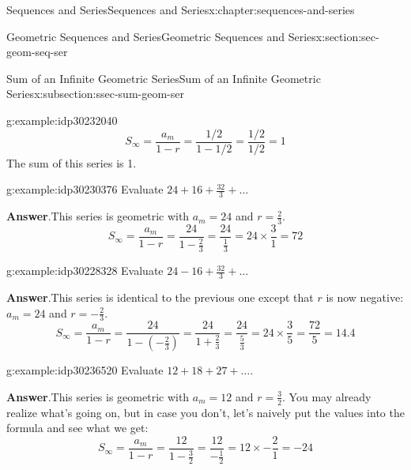 \documentclass[twoside,10pt,]{book}
\newcommand{\blocktitlefont}{\relax}
\numberwithin{equation}{section}
\begin{document}
\begin{chapterptx}{Sequences and Series}{}{Sequences and Series}{}{}{x:chapter:sequences-and-series}
\begin{sectionptx}{Geometric Sequences and Series}{}{Geometric Sequences and Series}{}{}{x:section:sec-geom-seq-ser}
\begin{subsectionptx}{Sum of an Infinite Geometric Series}{}{Sum of an Infinite Geometric Series}{}{}{x:subsection:ssec-sum-geom-ser}
\begin{example}{}{g:example:idp30232040}
\begin{equation*}
{S_\infty } = \frac{{{a_m}}}{{1 - r}} = \frac{{1/2}}{{1 - 1/2}} = \frac{{1/2}}{{1/2}} = 1
\end{equation*}
The sum of this series is 1.\end{example}
 \begin{example}{}{g:example:idp30230376}%
Evaluate \(24 + 16 + \frac{32}{3}+ \ldots\)\par\smallskip%
\noindent\textbf{\blocktitlefont Answer}.\label{g:answer:idp30230632}{}\hypertarget{g:answer:idp30230632}{}\quad{}This series is geometric with \(a_m = 24\) and \(r = \frac{2}{3}\).%
\begin{equation*}
{S_\infty } = \frac{{{a_m}}}{{1 - r}} = \frac{{24}}{{1 - \frac{2}{3}}} = \frac{{24}}{{\frac{1}{3}}} = 24 \times \frac{3}{1} = 72
\end{equation*}
\end{example}
 \begin{example}{}{g:example:idp30228328}%
Evaluate \(24 - 16 + \frac{32}{3}+ \ldots\)\par\smallskip%
\noindent\textbf{\blocktitlefont Answer}.\label{g:answer:idp30238440}{}\hypertarget{g:answer:idp30238440}{}\quad{}This series is identical to the previous one except that \(r\) is now negative:  \(a_m = 24\) and \(r = -\frac{2}{3}\).%
\begin{equation*}
{S_\infty } = \frac{{{a_m}}}{{1 - r}} = \frac{{24}}{{1 - \left( { - \frac{2}{3}} \right)}} = \frac{{24}}{{1 + \frac{2}{3}}} = \frac{{24}}{{\frac{5}{3}}} = 24 \times \frac{3}{5} = \frac{{72}}{5} = 14.4
\end{equation*}
\end{example}
 \begin{example}{}{g:example:idp30236520}%
Evaluate \(12 + 18 + 27 + \ldots\).\par\smallskip%
\noindent\textbf{\blocktitlefont Answer}.\label{g:answer:idp30238184}{}\hypertarget{g:answer:idp30238184}{}\quad{}This series is geometric with \(a_m = 12\) and \(r = \frac{3}{2}\).  You may already realize what's going on, but in case you don't, let's naively put the values into the formula and see what we get:%
\begin{equation*}
{S_\infty } = \frac{{{a_m}}}{{1 - r}} = \frac{{12}}{{1 - \frac{3}{2}}} = \frac{{12}}{{ - \frac{1}{2}}} = 12 \times  - \frac{2}{1} =  - 24
\end{equation*}

\end{example}
\end{subsectionptx}
\end{sectionptx}
\end{chapterptx}
\end{document}
